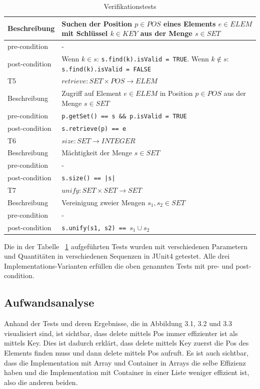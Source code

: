 \documentclass[11pt]{scrartcl}
\begin{document}
\begin{table}
\begin{tabular}[ht]{|l|p{12cm}|}
Beschreibung  & Suchen der Position \(p \in POS\) eines Elements \(e \in ELEM\) mit Schlüssel \(k \in KEY\) aus der Menge \(s \in SET\)           \\ \hline
pre-condition  & -           \\ \hline
post-condition & Wenn \(k \in s\): \texttt{s.find(k).isValid = TRUE}. Wenn \(k \notin s\): \texttt{s.find(k).isValid = FALSE}           \\ \hline
\hline
T5             & \(retrieve : SET \times POS \to ELEM\) \\ \hline
Beschreibung  & Zugriff auf Element \(e \in ELEM\) in Position \(p \in POS\) aus der Menge \(s \in SET\)           \\ \hline
pre-condition  & \texttt{p.getSet() == s \&\& p.isValid = TRUE}           \\ \hline
post-condition & \texttt{s.retrieve(p) == e}           \\ \hline
\hline
T6             & \(size : SET \to INTEGER\) \\ \hline
Beschreibung  & Mächtigkeit der Menge \(s \in SET\)           \\ \hline
pre-condition  & -           \\ \hline
post-condition & \texttt{s.size() == |s|}           \\ \hline
\hline
T7             & \(unify : SET \times SET \to SET\) \\ \hline
Beschreibung  & Vereinigung zweier Mengen \(s_{1},s_{2} \in SET\)           \\ \hline
pre-condition  & -           \\ \hline
post-condition & \texttt{s.unify(s1, s2) == }\(s_{1} \cup s_{2}\)           \\ \hline
\end{tabular}
\caption{Verifikationstests}
\label{table:vertests}
\end{table}

Die in der Tabelle ~\ref{table:vertests} aufgeführten Tests wurden mit verschiedenen Parametern und Quantitäten in verschiedenen Sequenzen in JUnit4 getestet. 
Alle drei Implementations-Varianten erfüllen die oben genannten Tests mit pre- und post-condition.

\subsection{Aufwandsanalyse}
\label{sec:aufwand}

Anhand der Tests und deren Ergebnisse, die in Abbildung 3.1, 3.2 und 3.3 visualisiert sind, ist sichtbar, dass delete mittels Pos immer effizienter ist als mittels Key. Dies ist dadurch erklärt, dass delete mittels Key zuerst die Pos des Elements finden muss und dann delete mittels Pos aufruft. Es ist auch sichtbar, dass die Implementation mit Array und Container in Arrays die selbe Effizienz haben und die Implementation mit Container in einer Liste weniger effizient ist, also die anderen beiden.
\end{document}
